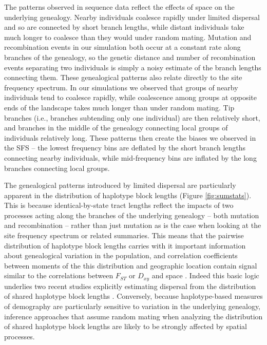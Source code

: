 \documentclass[11pt,twoside,lineno]{preprint}
\begin{document}
The patterns observed in sequence data reflect the effects of space on the underlying genealogy. Nearby individuals coalesce rapidly under limited dispersal and so are connected by short branch lengths, while distant individuals take much longer to coalesce than they would under random mating. Mutation and recombination events in our simulation both occur at a constant rate along branches of the genealogy, so the genetic distance and number of recombination events separating two individuals is simply a noisy estimate of the branch lengths connecting them. These genealogical patterns also relate directly to the site frequency spectrum. In our simulations we observed that groups of nearby individuals tend to coalesce rapidly, while coalescence among groups at opposite ends of the landscape takes much longer than under random mating. Tip branches (i.e., branches subtending only one individual) are then relatively short, and branches in the middle of the genealogy connecting local groups of individuals relatively long. These patterns then create the biases we observed in the SFS -- the lowest frequency bins are deflated by the short branch lengths connecting nearby individuals, while mid-frequency bins are inflated by the long branches connecting local groups. 

The genealogical patterns introduced by limited dispersal are particularly apparent in the distribution of haplotype block lengths (Figure \ref{fig:sumstats}). This is because identical-by-state tract lengths reflect the impacts of two processes acting along the branches of the underlying genealogy -- both mutation and recombination -- rather than just mutation as is the case when looking at the site frequency spectrum or related summaries. This means that the pairwise distribution of haplotype block lengths carries with it important information about genealogical variation in the population, and correlation coefficients between moments of the this distribution and geographic location contain signal similar to the correlations between $F_{ST}$ or $D_{xy}$ and space \citep{Rousset1997}. Indeed this basic logic underlies two recent studies explicitly estimating dispersal from the distribution of shared haplotype block lengths \citep{Ringbauer2017,Baharian2016}. Conversely, because haplotype-based measures of demography are particularly sensitive to variation in the underlying genealogy, inference approaches that assume random mating when analyzing the distribution of shared haplotype block lengths are likely to be strongly affected by spatial processes. 
\end{document}
